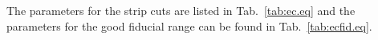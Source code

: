 %
%
%
%
%
%
%
%

\FloatBarrier
The parameters for the  strip cuts are listed in Tab.~\ref{tab:ec.eq} and the parameters for the good  fiducial range can be found in Tab.~\ref{tab:ecfid.eq}.
  
  

